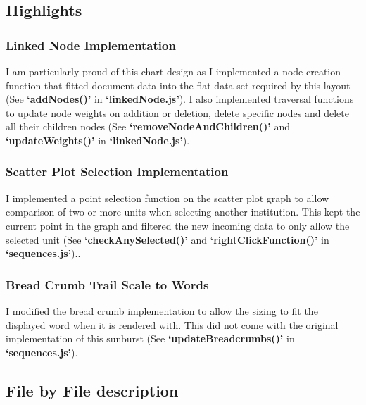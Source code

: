 \documentclass[a4paper, 11pt]{article}
\begin{document}
\subsection{Highlights} 
\subsubsection{Linked Node Implementation}
I am particularly proud of this chart design as I implemented a node creation function that fitted document data into the flat data set required by this layout (See \textbf{`addNodes()'} in \textbf{`linkedNode.js'}). I also implemented traversal functions to update node weights on addition or deletion, delete specific nodes and delete all their children nodes (See \textbf{`removeNodeAndChildren()'} and \textbf{`updateWeights()'} in \textbf{`linkedNode.js'}).

\subsubsection{Scatter Plot Selection Implementation}
I implemented a point selection function on the scatter plot graph to allow comparison of two or more units when selecting another institution. This kept the current point in the graph and filtered the new incoming data to only allow the selected unit (See \textbf{`checkAnySelected()'} and \textbf{`rightClickFunction()'} in \textbf{`sequences.js'})..

\subsubsection{Bread Crumb Trail Scale to Words}
I modified the bread crumb implementation to allow the sizing to fit the displayed word when it is rendered with. This did not come with the original implementation of this sunburst (See \textbf{`updateBreadcrumbs()'} in \textbf{`sequences.js'}).

\subsection{File by File description}
\end{document}
